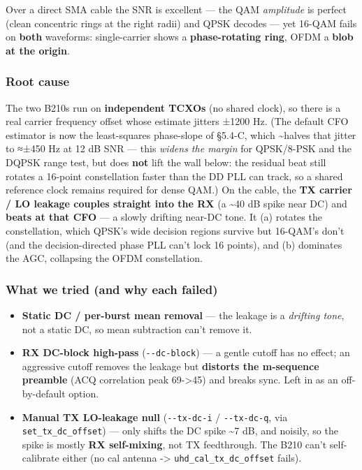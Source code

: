 \documentclass[
  10pt,
]{article}
\providecommand{\tightlist}{%
  \setlength{\itemsep}{0pt}\setlength{\parskip}{0pt}}
\begin{document}
Over a direct SMA cable the SNR is excellent --- the QAM
\emph{amplitude} is perfect (clean concentric rings at the right radii)
and QPSK decodes --- yet 16-QAM fails on \textbf{both} waveforms:
single-carrier shows a \textbf{phase-rotating ring}, OFDM a \textbf{blob
at the origin}.

\hypertarget{root-cause}{%
\subsubsection{Root cause}\label{root-cause}}

The two B210s run on \textbf{independent TCXOs} (no shared clock), so
there is a real carrier frequency offset whose estimate jitters ±1200
Hz. (The default CFO estimator is now the least-squares phase-slope of
§5.4-C, which \textasciitilde halves that jitter to ≈±450 Hz at 12 dB
SNR --- this \emph{widens the margin} for QPSK/8-PSK and the DQPSK range
test, but does \textbf{not} lift the wall below: the residual beat still
rotates a 16-point constellation faster than the DD PLL can track, so a
shared reference clock remains required for dense QAM.) On the cable,
the \textbf{TX carrier / LO leakage couples straight into the RX} (a
\textasciitilde40 dB spike near DC) and \textbf{beats at that CFO} --- a
slowly drifting near-DC tone. It (a) rotates the constellation, which
QPSK's wide decision regions survive but 16-QAM's don't (and the
decision-directed phase PLL can't lock 16 points), and (b) dominates the
AGC, collapsing the OFDM constellation.

\hypertarget{what-we-tried-and-why-each-failed}{%
\subsubsection{What we tried (and why each
failed)}\label{what-we-tried-and-why-each-failed}}

\begin{itemize}
\tightlist
\item
  \textbf{Static DC / per-burst mean removal} --- the leakage is a
  \emph{drifting tone}, not a static DC, so mean subtraction can't
  remove it.
\item
  \textbf{RX DC-block high-pass} (\texttt{-\/-dc-block}) --- a gentle
  cutoff has no effect; an aggressive cutoff removes the leakage but
  \textbf{distorts the m-sequence preamble} (ACQ correlation peak
  69-\textgreater45) and breaks sync. Left in as an off-by-default
  option.
\item
  \textbf{Manual TX LO-leakage null} (\texttt{-\/-tx-dc-i} /
  \texttt{-\/-tx-dc-q}, via \texttt{set\_tx\_dc\_offset}) --- only
  shifts the DC spike \textasciitilde7 dB, and noisily, so the spike is
  mostly \textbf{RX self-mixing}, not TX feedthrough. The B210 can't
  self-calibrate either (no cal antenna -\textgreater{}
  \texttt{uhd\_cal\_tx\_dc\_offset} fails).
\end{itemize}
\end{document}

